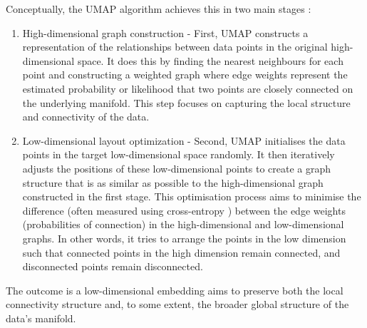 \documentclass[10pt,oneside]{report}
\begin{document}
\noindent Conceptually, the UMAP algorithm achieves this in two main stages \cite{mcinnes2018umap}:
\begin{enumerate}
    \item High-dimensional graph construction - First, UMAP constructs a representation of the relationships between data points in the original high-dimensional space. It does this by finding the nearest neighbours for each point and constructing a weighted graph where edge weights represent the estimated probability or likelihood that two points are closely connected on the underlying manifold. This step focuses on capturing the local structure and connectivity of the data.
    \item Low-dimensional layout optimization - Second, UMAP initialises the data points in the target low-dimensional space randomly. It then iteratively adjusts the positions of these low-dimensional points to create a graph structure that is as similar as possible to the high-dimensional graph constructed in the first stage. This optimisation process aims to minimise the difference (often measured using cross-entropy \cite{zhang2018generalized}) between the edge weights (probabilities of connection) in the high-dimensional and low-dimensional graphs. In other words, it tries to arrange the points in the low dimension such that connected points in the high dimension remain connected, and disconnected points remain disconnected.
\end{enumerate}

The outcome is a low-dimensional embedding aims to preserve both the local connectivity structure and, to some extent, the broader global structure of the data's manifold. 
\end{document}
